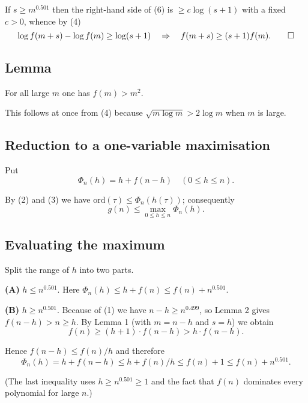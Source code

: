 \documentclass[12pt,a4paper]{article}
\theoremstyle{definition}
\begin{document}
        If $s \geq m^{0.501}$ then the right-hand side of (6) is $\geq c \log(s+1)$ with a fixed $c > 0$,
        whence by (4)
        $$\log f(m+s) - \log f(m) \geq \log(s+1) \quad \Rightarrow \quad f(m+s) \geq (s+1)f(m). \qed$$

\subsection*{Lemma}
    For all large $m$ one has $f(m) > m^2$.

    This follows at once from (4) because $\sqrt{m \log m} > 2 \log m$ when $m$ is large.


    \subsection*{Reduction to a one-variable maximisation}

    Put
    $$\Phi_n(h) = h + f(n-h) \quad (0 \leq h \leq n).$$

    By (2) and (3) we have $\text{ord}(\tau) \leq \Phi_n(h(\tau))$; consequently
    \begin{equation}
        g(n) \leq \max_{0 \leq h \leq n} \Phi_n(h).
    \end{equation}

    \subsection*{Evaluating the maximum}

    Split the range of $h$ into two parts.

    \textbf{(A)} $h \leq n^{0.501}$.
    Here $\Phi_n(h) \leq h + f(n) \leq f(n) + n^{0.501}$.

    \textbf{(B)} $h \geq n^{0.501}$.
    Because of (1) we have $n - h \geq n^{0.499}$, so Lemma 2 gives $f(n-h) > n \geq h$.
    By Lemma 1 (with $m = n-h$ and $s = h$) we obtain
    \begin{equation}
        f(n) \geq (h+1) \cdot f(n-h) > h \cdot f(n-h).
    \end{equation}

    Hence $f(n-h) \leq f(n)/h$ and therefore
    \begin{equation}
        \Phi_n(h) = h + f(n-h) \leq h + f(n)/h \leq f(n) + 1 \leq f(n) + n^{0.501}.
    \end{equation}

    (The last inequality uses $h \geq n^{0.501} \geq 1$ and the fact that $f(n)$ dominates every polynomial for large $n$.)
\end{document}

